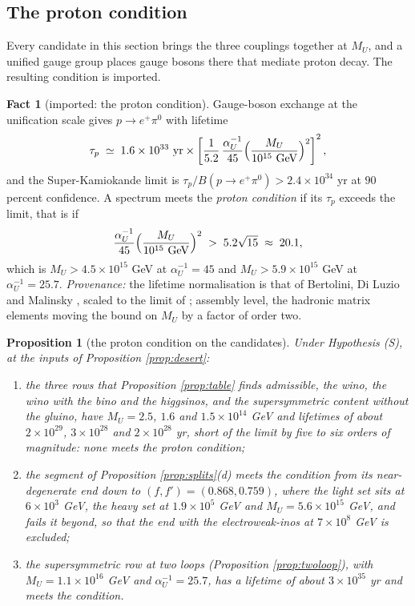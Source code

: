 \documentclass[11pt]{article}
\newtheorem{proposition}[theorem]{Proposition}
\theoremstyle{definition}
\newtheorem{fact}[theorem]{Fact}
\begin{document}
\subsection{The proton condition}\label{subsec:proton}

Every candidate in this section brings the three couplings together at $M_{U}$, and a unified gauge group places gauge bosons there that mediate proton decay. The resulting condition is imported.

\begin{fact}[imported: the proton condition]\label{fact:proton}
Gauge-boson exchange at the unification scale gives $p \to e^{+}\pi^{0}$ with lifetime
\[
\tau_{p} \;\simeq\; 1.6 \times 10^{33}\ \text{yr} \times \left[\frac{1}{5.2}\,\frac{\alpha_{U}^{-1}}{45}\Bigl(\frac{M_{U}}{10^{15}\ \text{GeV}}\Bigr)^{2}\right]^{2},
\]
and the Super-Kamiokande limit is $\tau_{p}/B(p \to e^{+}\pi^{0}) > 2.4 \times 10^{34}$ yr at $90$ percent confidence. A spectrum meets the \emph{proton condition} if its $\tau_{p}$ exceeds the limit, that is if
\[
\frac{\alpha_{U}^{-1}}{45}\Bigl(\frac{M_{U}}{10^{15}\ \text{GeV}}\Bigr)^{2} \;>\; 5.2\sqrt{15} \;\approx\; 20.1,
\]
which is $M_{U} > 4.5 \times 10^{15}$ GeV at $\alpha_{U}^{-1} = 45$ and $M_{U} > 5.9 \times 10^{15}$ GeV at $\alpha_{U}^{-1} = 25.7$. \emph{Provenance:} the lifetime normalisation is that of Bertolini, Di Luzio and Malinsky \cite{BertoliniDiLuzioMalinsky2009}, scaled to the limit of \cite{SuperK2020}; assembly level, the hadronic matrix elements moving the bound on $M_{U}$ by a factor of order two.
\end{fact}

\begin{proposition}[the proton condition on the candidates]\label{prop:proton}
Under Hypothesis (S), at the inputs of Proposition \ref{prop:desert}:
\begin{enumerate}
\item[(1)] the three rows that Proposition \ref{prop:table} finds admissible, the wino, the wino with the bino and the higgsinos, and the supersymmetric content without the gluino, have $M_{U} = 2.5$, $1.6$ and $1.5 \times 10^{14}$ GeV and lifetimes of about $2 \times 10^{29}$, $3 \times 10^{28}$ and $2 \times 10^{28}$ yr, short of the limit by five to six orders of magnitude: none meets the proton condition;
\item[(2)] the segment of Proposition \ref{prop:splits}(d) meets the condition from its near-degenerate end down to $(f, f') = (0.868, 0.759)$, where the light set sits at $6 \times 10^{3}$ GeV, the heavy set at $1.9 \times 10^{5}$ GeV and $M_{U} = 5.6 \times 10^{15}$ GeV, and fails it beyond, so that the end with the electroweak-inos at $7 \times 10^{8}$ GeV is excluded;
\item[(3)] the supersymmetric row at two loops (Proposition \ref{prop:twoloop}), with $M_{U} = 1.1 \times 10^{16}$ GeV and $\alpha_{U}^{-1} = 25.7$, has a lifetime of about $3 \times 10^{35}$ yr and meets the condition.
\end{enumerate}
\end{proposition}
\end{document}
